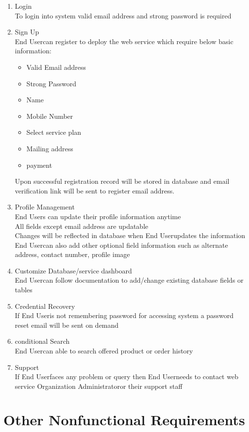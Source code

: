 \documentclass{report}
\newcommand*\arrow{\item[$\Rightarrow$]}
\def\admin{Organization Administrator}
\def\user{End User}
\begin{document}
\begin{enumerate}[start=1,label={\bfseries REQ \arabic*:}]
	\addtolength{\itemindent}{40pt}
	\item Login
		\\To login into system valid email address and strong password is required
	\item Sign Up
		\\ \user \space can register to deploy the web service which require below basic information:
			\begin{itemize}
				\arrow Valid Email address
				\arrow Strong Password
				\arrow Name
				\arrow Mobile Number
				\arrow Select service plan
				\arrow Mailing address
				\arrow payment
			\end{itemize}
		Upon successful registration record will be stored in database and email verification link will be sent to register email address.
	\item Profile Management
		\\ \user s can update their profile information anytime
		\\All fields except email address are updatable
		\\Changes will be reflected in database when \user \space updates the information
		\\ \user can also add other optional field information such as alternate address, contact number, profile image
	\item Customize Database/service dashboard
		\\ \user \space can follow documentation to add/change existing database fields or tables
	\item Credential Recovery
		\\If \user \space is not remembering password for accessing system a password reset email will be sent on demand
	\item conditional Search
		\\ \user \space can able to search offered product or order history
	\item Support
		\\If \user \space faces any problem or query then \user \space needs to contact web service \admin \space or their support staff
\end{enumerate}

\chapter{Other Nonfunctional Requirements}
\end{document}
